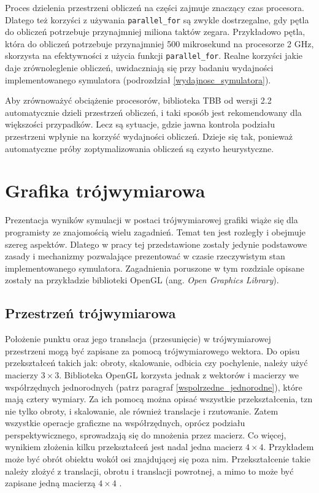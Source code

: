 \documentclass[12pt, twoside, openany]{report}
\begin{document}
Proces dzielenia przestrzeni obliczeń na części zajmuje znaczący czas procesora. Dlatego też korzyści z używania \texttt{parallel\_for} są zwykle dostrzegalne, gdy pętla do obliczeń potrzebuje przynajmniej miliona taktów zegara. Przykładowo pętla, która do obliczeń potrzebuje przynajmniej 500 mikrosekund na procesorze 2 GHz, skorzysta na efektywności z użycia funkcji \texttt{parallel\_for}. Realne korzyści jakie daje zrównoleglenie obliczeń, uwidaczniają się przy badaniu wydajności implementowanego symulatora (podrozdział \ref{wydajnosc_symulatora}).

Aby zrównoważyć obciążenie procesorów, biblioteka TBB od wersji 2.2 automatycznie dzieli przestrzeń obliczeń, i taki sposób jest rekomendowany dla większości przypadków. Lecz są sytuacje, gdzie jawna kontrola podziału przestrzeni wpłynie na korzyść wydajności obliczeń. Dzieje się tak, ponieważ automatyczne próby zoptymalizowania obliczeń są czysto heurystyczne.



\chapter{Grafika trójwymiarowa}

Prezentacja wyników symulacji w postaci trójwymiarowej grafiki wiąże się dla programisty ze znajomością wielu zagadnień. Temat ten jest rozległy i obejmuje szereg aspektów. Dlatego w pracy tej przedstawione zostały jedynie podstawowe zasady i mechanizmy pozwalające prezentować w czasie rzeczywistym stan implementowanego symulatora. Zagadnienia poruszone w tym rozdziale opisane zostały na przykładzie biblioteki OpenGL (ang. \textit{Open Graphics Library}).

\section{Przestrzeń trójwymiarowa}

Położenie punktu oraz jego translacja (przesunięcie) w trójwymiarowej przestrzeni mogą być zapisane za pomocą trójwymiarowego wektora. Do opisu przekształceń takich jak: obroty, skalowanie, odbicia czy pochylenie, należy użyć macierzy $3\times 3$. Biblioteka OpenGL korzysta jednak z wektorów i macierzy we współrzędnych jednorodnych (patrz paragraf \ref{wspolrzedne_jednorodne}), które mają cztery wymiary. Za ich pomocą można opisać wszystkie przekształcenia, tzn nie tylko obroty, i skalowanie, ale również translacje i rzutowanie. Zatem wszystkie operacje graficzne na współrzędnych, oprócz podziału perspektywicznego, sprowadzają się do mnożenia przez macierz. Co więcej, wynikiem złożenia kilku przekształceń jest nadal jedna macierz $4\times 4$. Przykładem może być obrót obiektu wokół osi znajdującej się poza nim. Przekształcenie takie należy złożyć z translacji, obrotu i translacji powrotnej, a mimo to może być zapisane jedną macierzą $4\times 4$ \cite{bib:matulewski}.
\end{document}
